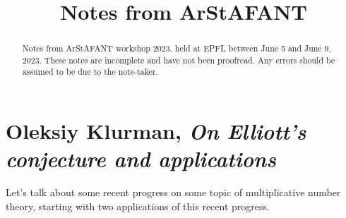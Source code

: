 \documentclass[reqno]{amsart} 
\title{Notes from ArStAFANT}
\begin{document}
\maketitle

\begin{abstract}
  Notes from ArStAFANT workshop 2023, held at EPFL between June 5 and June 9, 2023.  These notes are incomplete and have not been proofread.  Any errors should be assumed to be due to the note-taker.
\end{abstract}

\tableofcontents

\section{Oleksiy Klurman, \emph{On Elliott's conjecture and applications}}
Let's talk about some recent progress on some topic of multiplicative number theory, starting with two applications of this recent progress.
\end{document}
